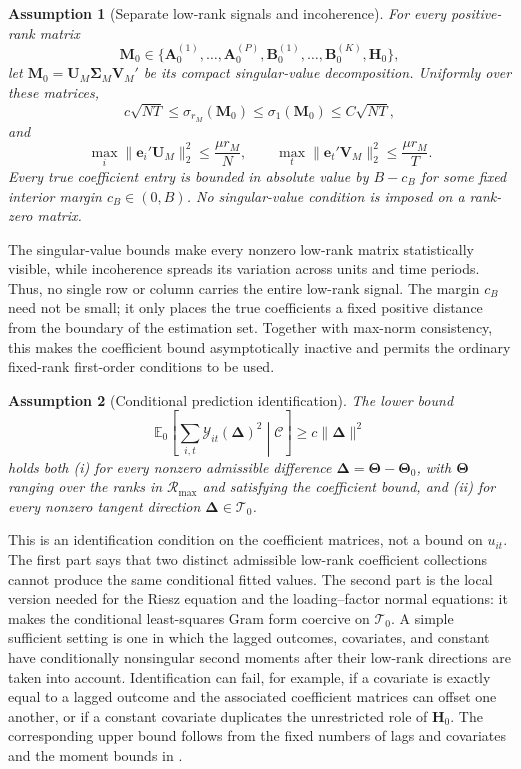 \documentclass[11pt]{article}
\numberwithin{equation}{section}
\newtheorem{assumption}{Assumption}
\theoremstyle{remark}
\newcommand{\Ezero}{\mathbb E_0}
\newcommand{\be}{\bm e}
\newcommand{\bA}{\bm A}
\newcommand{\bB}{\bm B}
\newcommand{\bH}{\bm H}
\newcommand{\bM}{\bm M}
\newcommand{\bU}{\bm U}
\newcommand{\bV}{\bm V}
\newcommand{\bDelta}{\bm\Delta}
\newcommand{\bTheta}{\bm\Theta}
\newcommand{\bSigma}{\bm\Sigma}
\newcommand{\calR}{\mathcal R}
\newcommand{\calT}{\mathcal T}
\begin{document}
\begin{assumption}[Separate low-rank signals and incoherence]
\label{a:signal}
For every positive-rank matrix
$$
\bM_0
\in
\{\bA_0^{(1)},\ldots,\bA_0^{(P)},
\bB_0^{(1)},\ldots,\bB_0^{(K)},\bH_0\},
$$
let $\bM_0=\bU_M\bSigma_M\bV_M'$ be its compact singular-value decomposition. Uniformly over these matrices,
$$
c\sqrt{NT}
\le
\sigma_{r_M}(\bM_0)
\le
\sigma_1(\bM_0)
\le
C\sqrt{NT},
$$
and
$$
\max_i\|\be_i'\bU_M\|_2^2\le \frac{\mu r_M}{N},
\qquad
\max_t\|\be_t'\bV_M\|_2^2\le \frac{\mu r_M}{T}.
$$
Every true coefficient entry is bounded in absolute value by $B-c_B$ for some fixed interior margin $c_B\in(0,B)$. No singular-value condition is imposed on a rank-zero matrix.
\end{assumption}
The singular-value bounds make every nonzero low-rank matrix statistically visible, while incoherence spreads its variation across units and time periods. Thus, no single row or column carries the entire low-rank signal. The margin $c_B$ need not be small; it only places the true coefficients a fixed positive distance from the boundary of the estimation set. Together with max-norm consistency, this makes the coefficient bound asymptotically inactive and permits the ordinary fixed-rank first-order conditions to be used.

\begin{assumption}[Conditional prediction identification]
\label{a:identification}
The lower bound
\begin{equation}
\label{eq:conditional_identification}
\Ezero\!\left[
\sum_{i,t}\mathcal Y_{it}(\bDelta)^2
\middle|\mathscr C
\right]
\ge
c\|\bDelta\|^2
\end{equation}
holds both (i) for every nonzero admissible difference $\bDelta=\bTheta-\bTheta_0$, with $\bTheta$ ranging over the ranks in $\calR_{\max}$ and satisfying the coefficient bound, and (ii) for every nonzero tangent direction $\bDelta\in\calT_0$.
\end{assumption}
This is an identification condition on the coefficient matrices, not a bound on $u_{it}$. The first part says that two distinct admissible low-rank coefficient collections cannot produce the same conditional fitted values. The second part is the local version needed for the Riesz equation and the loading--factor normal equations: it makes the conditional least-squares Gram form coercive on $\calT_0$. A simple sufficient setting is one in which the lagged outcomes, covariates, and constant have conditionally nonsingular second moments after their low-rank directions are taken into account. Identification can fail, for example, if a covariate is exactly equal to a lagged outcome and the associated coefficient matrices can offset one another, or if a constant covariate duplicates the unrestricted role of $\bH_0$. The corresponding upper bound follows from the fixed numbers of lags and covariates and the moment bounds in .
\end{document}
